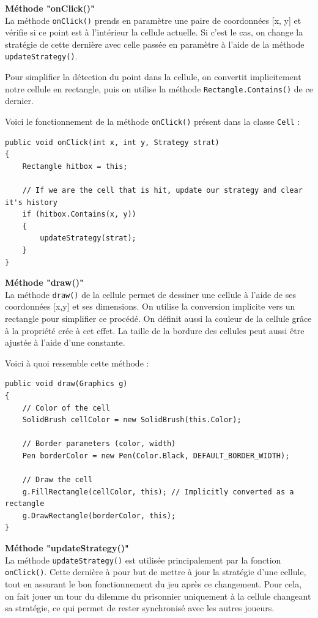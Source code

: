 \documentclass[a4paper]{article}
\begin{document}
\pagebreak
\textbf{Méthode "onClick()"}\\
La méthode \texttt{onClick()} prends en paramètre une paire de coordonnées [x, y] et vérifie si ce point est à l'intérieur la cellule actuelle. Si c'est le cas, on change la stratégie de cette dernière avec celle passée en paramètre à l'aide de la méthode \texttt{updateStrategy()}. 

Pour simplifier la détection du point dans la cellule, on convertit implicitement notre cellule en rectangle, puis on utilise la méthode \texttt{Rectangle.Contains()} de ce dernier.

Voici le fonctionnement de la méthode \texttt{onClick()} présent dans la classe \texttt{Cell} :
\begin{lstlisting}
public void onClick(int x, int y, Strategy strat)
{
    Rectangle hitbox = this;

    // If we are the cell that is hit, update our strategy and clear it's history
    if (hitbox.Contains(x, y))
    {
        updateStrategy(strat);
    }
}
\end{lstlisting}

\textbf{Méthode "draw()"}\\
La méthode \texttt{draw()} de la cellule permet de dessiner une cellule à l'aide de ses coordonnées [x,y] et ses dimensions. On utilise la conversion implicite vers un rectangle pour simplifier ce procédé. On définit aussi la couleur de la cellule grâce à la propriété crée à cet effet. La taille de la bordure des cellules peut aussi être ajustée à l'aide d'une constante.

Voici à quoi ressemble cette méthode :
\begin{lstlisting}
public void draw(Graphics g)
{
    // Color of the cell
    SolidBrush cellColor = new SolidBrush(this.Color);
    
    // Border parameters (color, width)
    Pen borderColor = new Pen(Color.Black, DEFAULT_BORDER_WIDTH);
    
    // Draw the cell
    g.FillRectangle(cellColor, this); // Implicitly converted as a rectangle
    g.DrawRectangle(borderColor, this);
}
\end{lstlisting}

\textbf{Méthode "updateStrategy()"}\\
La méthode \texttt{updateStrategy()} est utilisée principalement par la fonction \texttt{onClick()}. Cette dernière à pour but de mettre à jour la stratégie d'une cellule, tout en assurant le bon fonctionnement du jeu après ce changement. Pour cela, on fait jouer un tour du dilemme du prisonnier uniquement à la cellule changeant sa stratégie, ce qui permet de rester synchronisé avec les autres joueurs.
\end{document}

